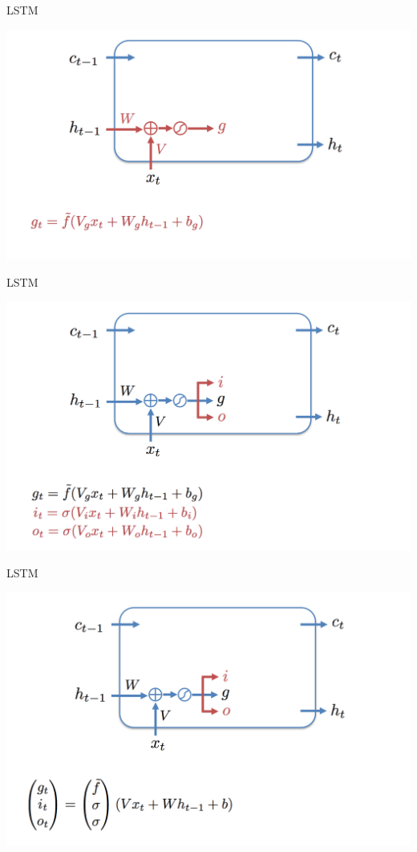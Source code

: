 \documentclass[notes,12pt, aspectratio=169]{beamer}
\begin{document}
\begin{frame}{LSTM}
\begin{center}
	\includegraphics[width=.8\linewidth]{lstm2.png}
\end{center}
\end{frame}


\begin{frame}{LSTM}
\begin{center}
	\includegraphics[width=.8\linewidth]{lstm3.png}
\end{center}
\end{frame}


\begin{frame}{LSTM}
\begin{center}
	\includegraphics[width=.8\linewidth]{lstm4.png}
\end{center}
\end{frame}
\end{document}
